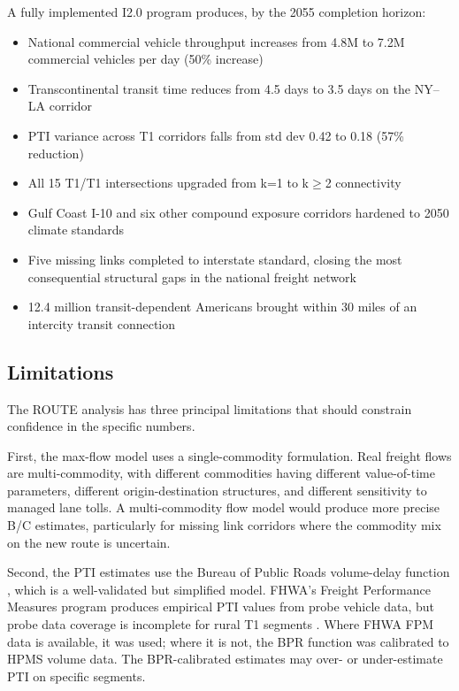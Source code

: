 A fully implemented I2.0 program produces, by the 2055 completion horizon:
\begin{itemize}
  \item National commercial vehicle throughput increases from 4.8M to 7.2M commercial vehicles per day (50\% increase)
  \item Transcontinental transit time reduces from 4.5 days to 3.5 days on the NY--LA corridor
  \item PTI variance across T1 corridors falls from std dev 0.42 to 0.18 (57\% reduction)
  \item All 15 T1/T1 intersections upgraded from k=1 to k$\geq$2 connectivity
  \item Gulf Coast I-10 and six other compound exposure corridors hardened to 2050 climate standards
  \item Five missing links completed to interstate standard, closing the most consequential structural gaps in the national freight network
  \item 12.4 million transit-dependent Americans brought within 30 miles of an intercity transit connection
\end{itemize}

\subsection{Limitations}

The ROUTE analysis has three principal limitations that should constrain confidence in the specific numbers.

First, the max-flow model uses a single-commodity formulation. Real freight flows are multi-commodity, with different commodities having different value-of-time parameters, different origin-destination structures, and different sensitivity to managed lane tolls. A multi-commodity flow model would produce more precise B/C estimates, particularly for missing link corridors where the commodity mix on the new route is uncertain.

Second, the PTI estimates use the Bureau of Public Roads volume-delay function \citep{BPR1964}, which is a well-validated but simplified model. FHWA's Freight Performance Measures program produces empirical PTI values from probe vehicle data, but probe data coverage is incomplete for rural T1 segments \citep{FHWA_freight2023}. Where FHWA FPM data is available, it was used; where it is not, the BPR function was calibrated to HPMS volume data. The BPR-calibrated estimates may over- or under-estimate PTI on specific segments.

